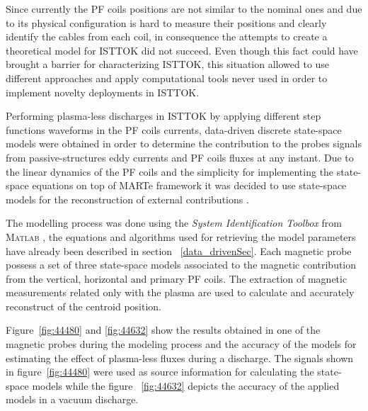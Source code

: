  Since currently the PF coils positions are not similar to the nominal ones and due to its physical configuration is hard to measure their positions and clearly identify the cables from each coil, in consequence the attempts to create a theoretical model for ISTTOK did not succeed. Even though this fact could have brought a barrier for characterizing ISTTOK, this situation allowed to use different approaches and apply computational tools never used  in order to implement novelty deployments in ISTTOK.   \smallskip

Performing plasma-less discharges in ISTTOK by applying different step functions waveforms in the PF coils currents,  data-driven discrete state-space models were obtained in order to determine the contribution to the probes signals from passive-structures eddy currents and PF coils fluxes at any instant. Due to the linear dynamics of the PF coils and the simplicity for implementing the state-space equations on top of MARTe framework it was decided to use state-space models for the reconstruction of external contributions \cite[Chapter~2]{Chen1999}.\smallskip

 The modelling process was done using the \textit{System Identification Toolbox} from \textsc{Matlab} \cite[Chapters~2,3]{Toolbox}, the equations and algorithms used for retrieving the model parameters have already been described  in section ~\ref{data_drivenSec}. Each magnetic probe possess a set of three state-space models associated to the magnetic contribution from the vertical, horizontal and primary PF coils. The extraction of magnetic measurements related only with the plasma  are used to calculate and accurately reconstruct of the centroid position. \smallskip


Figure~\ref{fig:44480} and \ref{fig:44632} show the results obtained in one of the magnetic probes during the modeling process and the accuracy of the models for estimating the effect of plasma-less fluxes during a discharge. The signals shown in figure~\ref{fig:44480} were used as source information for calculating the state-space models while the figure ~\ref{fig:44632} depicts the accuracy of the applied models in a vacuum discharge.

